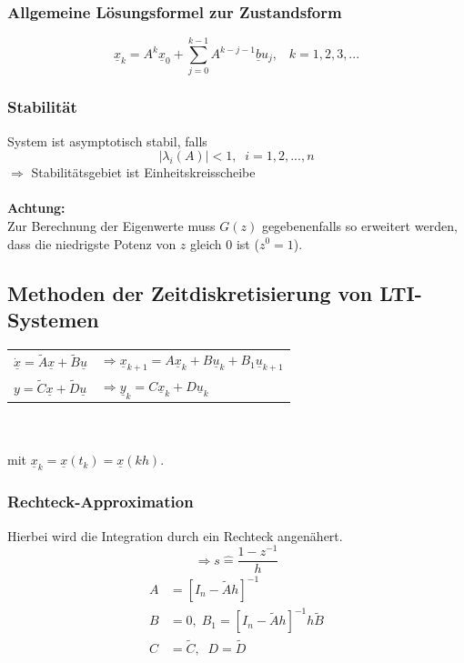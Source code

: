 \documentclass[a4paper,twocolumn,10pt]{article}
\newcommand{\entspr}{\widehat{=}}
\begin{document}
\subsubsection{Allgemeine Lösungsformel zur Zustandsform}
\begin{equation*}
\underline{x}_k=A^k\underline{x}_0+\sum\limits_{j=0}^{k-1}A^{k-j-1}\underline{b}u_j,\;\;\;k=1,2,3,...
\end{equation*}

\subsubsection{Stabilität}
System ist asymptotisch stabil, falls
\begin{equation*}
|\lambda_i(A)|<1,\;\;i=1,2,...,n
\end{equation*}
$\Rightarrow$ Stabilitätsgebiet ist Einheitskreisscheibe\\\\
\textbf{Achtung:}\\
Zur Berechnung der Eigenwerte muss $G(z)$ gegebenenfalls so erweitert werden, dass die niedrigste Potenz von $z$ gleich $0$ ist ($z^0=1$).

\subsection{Methoden der Zeitdiskretisierung von LTI-Systemen}
\begin{tabular}{ll}
$\underline{\dot{x}}=\tilde{A}\underline{x}+\tilde{B}\underline{u}$ & $\Rightarrow \underline{x}_{k+1}=A\underline{x}_k+B\underline{u}_k+B_1\underline{u}_{k+1}$\\
$y=\tilde{C}\underline{x}+\tilde{D}\underline{u}$ & $\Rightarrow \underline{y}_k=C\underline{x}_k+D\underline{u}_k$
\end{tabular}\\\\
mit $\underline{x}_k=\underline{x}(t_k)=\underline{x}(kh)$.

\subsubsection{Rechteck-Approximation}
Hierbei wird die Integration durch ein Rechteck angenähert.
\begin{equation*}
\Rightarrow s\entspr\frac{1-z^{-1}}{h}
\end{equation*}
\begin{equation*}
\begin{split}
A&=[I_n-\tilde{A}h]^{-1}\\
B&=0,\;B_1=[I_n-\tilde{A}h]^{-1}h\tilde{B}\\
C&=\tilde{C},\;\;D=\tilde{D}
\end{split}
\end{equation*}
\end{document}
